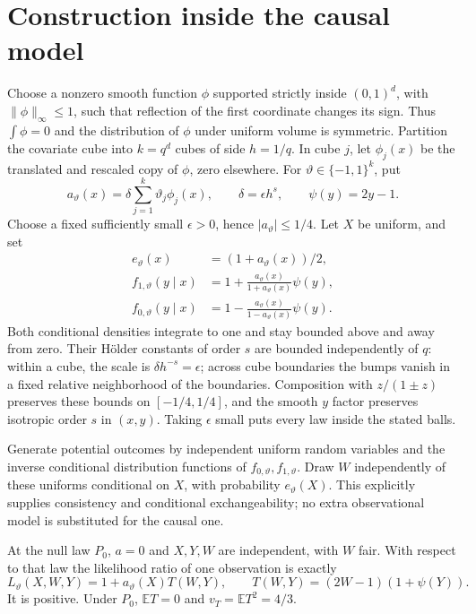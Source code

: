 \documentclass[11pt,a4paper]{article}
\theoremstyle{remark}
\newcommand{\E}{\mathbb E}
\begin{document}
\section{Construction inside the causal model}
Choose a nonzero smooth function $\phi$ supported strictly inside $(0,1)^d$, with $\|\phi\|_\infty\le1$, such that reflection of the first coordinate changes its sign. Thus $\int\phi=0$ and the distribution of $\phi$ under uniform volume is symmetric. Partition the covariate cube into $k=q^d$ cubes of side $h=1/q$. In cube $j$, let $\phi_j(x)$ be the translated and rescaled copy of $\phi$, zero elsewhere. For $\vartheta\in\{-1,1\}^k$, put
\[
 a_\vartheta(x)=\delta\sum_{j=1}^k\vartheta_j\phi_j(x),
 \qquad \delta=\epsilon h^s,
 \qquad\psi(y)=2y-1.
\]
Choose a fixed sufficiently small $\epsilon>0$, hence $|a_\vartheta|\le1/4$. Let $X$ be uniform, and set
\begin{align*}
 e_\vartheta(x)&=(1+a_\vartheta(x))/2,\\
 f_{1,\vartheta}(y\mid x)&=1+\frac{a_\vartheta(x)}{1+a_\vartheta(x)}\psi(y),\\
 f_{0,\vartheta}(y\mid x)&=1-\frac{a_\vartheta(x)}{1-a_\vartheta(x)}\psi(y).
\end{align*}
Both conditional densities integrate to one and stay bounded above and away from zero. Their H\"older constants of order $s$ are bounded independently of $q$: within a cube, the scale is $\delta h^{-s}=\epsilon$; across cube boundaries the bumps vanish in a fixed relative neighborhood of the boundaries. Composition with $z/(1\pm z)$ preserves these bounds on $[-1/4,1/4]$, and the smooth $y$ factor preserves isotropic order $s$ in $(x,y)$. Taking $\epsilon$ small puts every law inside the stated balls.

Generate potential outcomes by independent uniform random variables and the inverse conditional distribution functions of $f_{0,\vartheta},f_{1,\vartheta}$. Draw $W$ independently of these uniforms conditional on $X$, with probability $e_\vartheta(X)$. This explicitly supplies consistency and conditional exchangeability; no extra observational model is substituted for the causal one.

At the null law $P_0$, $a=0$ and $X,Y,W$ are independent, with $W$ fair. With respect to that law the likelihood ratio of one observation is exactly
\[
 L_\vartheta(X,W,Y)=1+a_\vartheta(X)T(W,Y),
 \qquad T(W,Y)=(2W-1)(1+\psi(Y)). \tag{2}
\]
It is positive. Under $P_0$, $\E T=0$ and $v_T=\E T^2=4/3$.
\end{document}
